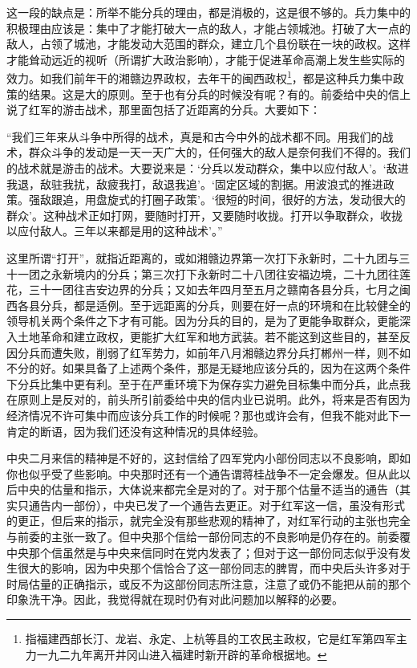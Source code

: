 \documentclass[UTF8, 12pt, a4paper]{ctexrep}
\begin{document}
这一段的缺点是：所举不能分兵的理由，都是消极的，这是很不够的。兵力集中的积极理由应该是：集中了才能打破大一点的敌人，才能占领城池。打破了大一点的敌人，占领了城池，才能发动大范围的群众，建立几个县份联在一块的政权。这样才能耸动远近的视听（所谓扩大政治影响），才能于促进革命高潮上发生些实际的效力。如我们前年干的湘赣边界政权，去年干的闽西政权\footnote{指福建西部长汀、龙岩、永定、上杭等县的工农民主政权，它是红军第四军主力一九二九年离开井冈山进入福建时新开辟的革命根据地。}，都是这种兵力集中政策的结果。这是大的原则。至于也有分兵的时候没有呢？有的。前委给中央的信上说了红军的游击战术，那里面包括了近距离的分兵。大要如下：

“我们三年来从斗争中所得的战术，真是和古今中外的战术都不同。用我们的战术，群众斗争的发动是一天一天广大的，任何强大的敌人是奈何我们不得的。我们的战术就是游击的战术。大要说来是：‘分兵以发动群众，集中以应付敌人’。‘敌进我退，敌驻我扰，敌疲我打，敌退我追’。‘固定区域的割据。用波浪式的推进政策。强敌跟追，用盘旋式的打圈子政策’。‘很短的时间，很好的方法，发动很大的群众’。这种战术正如打网，要随时打开，又要随时收拢。打开以争取群众，收拢以应付敌人。三年以来都是用的这种战术’。”

这里所谓“打开”，就指近距离的，或如湘赣边界第一次打下永新时，二十九团与三十一团之永新境内的分兵；第三次打下永新时二十八团往安福边境，二十九团往莲花，三十一团往吉安边界的分兵；又如去年四月至五月之赣南各县分兵，七月之闽西各县分兵，都是适例。至于远距离的分兵，则要在好一点的环境和在比较健全的领导机关两个条件之下才有可能。因为分兵的目的，是为了更能争取群众，更能深入土地革命和建立政权，更能扩大红军和地方武装。若不能这到这些目的，甚至反因分兵而遭失败，削弱了红军势力，如前年八月湘赣边界分兵打郴州一样，则不如不分的好。如果具备了上述两个条件，那是无疑地应该分兵的，因为在这两个条件下分兵比集中更有利。至于在严重环境下为保存实力避免目标集中而分兵，此点我在原则上是反对的，前头所引前委给中央的信内业已说明。此外，将来是否有因为经济情况不许可集中而应该分兵工作的时候呢？那也或许会有，但我不能对此下一肯定的断语，因为我们还没有这种情况的具体经验。

中央二月来信的精神是不好的，这封信给了四军党内小部份同志以不良影响，即如你也似乎受了些影响。中央那时还有一个通告谓蒋桂战争不一定会爆发。但从此以后中央的估量和指示，大体说来都完全是对的了。对于那个估量不适当的通告（其实只通告内一部份），中央已发了一个通告去更正。对于红军这一信，虽没有形式的更正，但后来的指示，就完全没有那些悲观的精神了，对红军行动的主张也完全与前委的主张一致了。但中央那个信给一部份同志的不良影响是仍存在的。前委覆中央那个信虽然是与中央来信同时在党内发表了；但对于这一部份同志似乎没有发生很大的影响，因为中央那个信恰合了这一部份同志的脾胃，而中央后头许多对于时局估量的正确指示，或反不为这部份同志所注意，注意了或仍不能把从前的那个印象洗干净。因此，我觉得就在现时仍有对此问题加以解释的必要。
\end{document}
